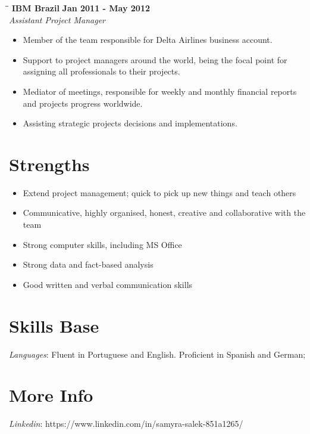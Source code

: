 \documentclass[margin]{res}
\begin{document}
\begin{resume}
\vspace{-0.1in}
    \begin{tabbing}
        \hspace{2.3in}\= \hspace{1.7in}\= \kill
        \textbf{IBM Brazil} \>\>\textbf{Jan 2011 - May 2012}\\
        \textit{Assistant Project Manager}\\        
    \end{tabbing}\vspace{-20pt}
    \vspace{2mm}
    \begin{itemize}
        \item Member of the team responsible for Delta Airlines business account.
        \item Support to project managers around the world, being the focal point for assigning all professionals to their projects.
        \item Mediator of meetings, responsible for weekly and monthly financial reports and projects progress worldwide.
        \item Assisting strategic projects decisions and implementations.
    \end{itemize}

\section{Strengths}
    \begin{itemize}
        \item Extend project management; quick to pick up new things and teach others
        \item Communicative, highly organised, honest, creative and collaborative with the team
        \item Strong computer skills, including MS Office
        \item Strong data and fact-based analysis
        \item Good written and verbal communication skills
    \end{itemize}

\section{Skills Base}
	\textit{Languages}: Fluent in Portuguese and English. Proficient in Spanish and German;
 
\section{More Info}
    \textit{Linkedin}: https://www.linkedin.com/in/samyra-salek-851a1265/

\end{resume} 
\end{document}
